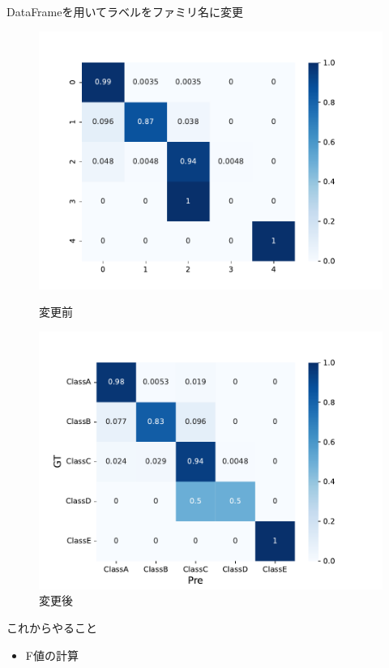 \documentclass[leno,xcolor=dvipsnames]{beamer}
\begin{document}
  \begin{frame}
    DataFrameを用いてラベルをファミリ名に変更
    \begin{figure}[htbp]
      \begin{minipage}[b]{0.45\linewidth}
        \centering
        \includegraphics[keepaspectratio, scale=0.3]{images/deep_conv_heatmap.pdf}
        \caption{変更前}
      \end{minipage}
      \begin{minipage}[b]{0.45\linewidth}
        \centering
        \includegraphics[keepaspectratio, scale=0.3]{images/deepimfam_confusion_matrix_ratio.pdf}
        \caption{変更後}
      \end{minipage}
    \end{figure}
  \end{frame}

  \begin{frame}{これからやること}
    \begin{itemize}
      \item F値の計算
    \end{itemize}
  \end{frame}
\end{document}

